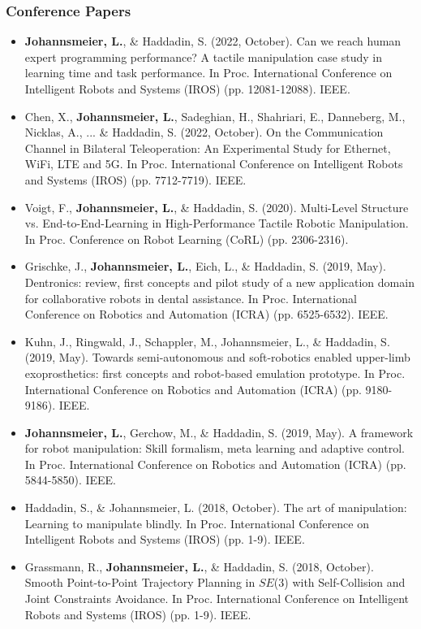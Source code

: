 \subsubsection*{Conference Papers}
\begin{itemize}
    \item \textbf{Johannsmeier, L.}, \& Haddadin, S. (2022, October). Can we reach human expert programming performance? A tactile manipulation case study in learning time and task performance. In Proc. International Conference on Intelligent Robots and Systems (IROS) (pp. 12081-12088). IEEE.
    \item Chen, X., \textbf{Johannsmeier, L.}, Sadeghian, H., Shahriari, E., Danneberg, M., Nicklas, A., ... \& Haddadin, S. (2022, October). On the Communication Channel in Bilateral Teleoperation: An Experimental Study for Ethernet, WiFi, LTE and 5G. In Proc. International Conference on Intelligent Robots and Systems (IROS) (pp. 7712-7719). IEEE.
    \item Voigt, F., \textbf{Johannsmeier, L.}, \& Haddadin, S. (2020). Multi-Level Structure vs. End-to-End-Learning in High-Performance Tactile Robotic Manipulation. In Proc. Conference on Robot Learning (CoRL) (pp. 2306-2316).
    \item Grischke, J., \textbf{Johannsmeier, L.}, Eich, L., \& Haddadin, S. (2019, May). Dentronics: review, first concepts and pilot study of a new application domain for collaborative robots in dental assistance. In Proc. International Conference on Robotics and Automation (ICRA) (pp. 6525-6532). IEEE.
    \item Kuhn, J., Ringwald, J., Schappler, M., Johannsmeier, L., \& Haddadin, S. (2019, May). Towards semi-autonomous and soft-robotics enabled upper-limb exoprosthetics: first concepts and robot-based emulation prototype. In Proc. International Conference on Robotics and Automation (ICRA) (pp. 9180-9186). IEEE.
    \item \textbf{Johannsmeier, L.}, Gerchow, M., \& Haddadin, S. (2019, May). A framework for robot manipulation: Skill formalism, meta learning and adaptive control. In Proc. International Conference on Robotics and Automation (ICRA) (pp. 5844-5850). IEEE.
    \item Haddadin, S., \& Johannsmeier, L. (2018, October). The art of manipulation: Learning to manipulate blindly. In Proc. International Conference on Intelligent Robots and Systems (IROS) (pp. 1-9). IEEE.
    \item Grassmann, R., \textbf{Johannsmeier, L.}, \& Haddadin, S. (2018, October). Smooth Point-to-Point Trajectory Planning in $ SE $(3) with Self-Collision and Joint Constraints Avoidance. In Proc. International Conference on Intelligent Robots and Systems (IROS) (pp. 1-9). IEEE.

\end{itemize}
